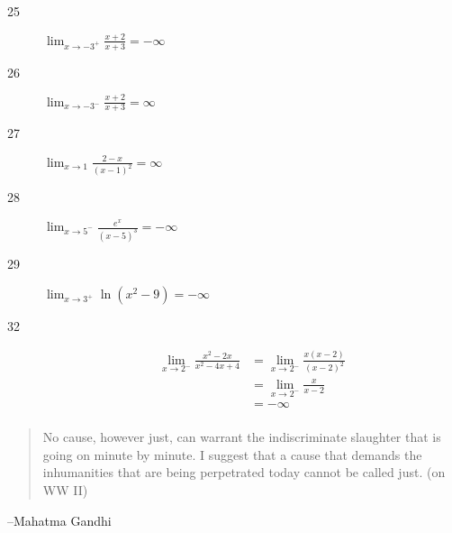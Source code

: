 \documentclass[letterpaper, landscape]{exam}
\begin{document}
\begin{description}




      \item[25] $\lim_{x \to -3^+} \frac{x + 2}{x + 3} = \boxed{ -\infty }$ 

      \item[26] $\lim_{x \to -3^-} \frac{x + 2}{x + 3} = \boxed{ \infty }$ 

      \item[27] $\lim_{x \to 1} \frac{2 - x}{(x - 1)^2} = \boxed{ \infty }$ 

      \item[28] $\lim_{x \to 5^-} \frac{e^x}{(x - 5)^3} = \boxed{ -\infty }$ 

      \item[29] $\lim_{x \to 3^+} \ln \left( x^2 - 9 \right) = \boxed{ -\infty }$ 

      \item[32] 
        \begin{align*}
          \lim_{x \to 2^-} \frac{x^2 - 2x}{x^2 - 4x + 4}   
            & = \lim_{x \to 2^-} \frac{x(x - 2)}{(x - 2)^2} \\
            & = \lim_{x \to 2^-} \frac{x}{x - 2} \\
            & = \boxed{ - \infty } \\
        \end{align*}


    \end{description}

  \else
    \vspace{11 cm}
    \begin{quote}
      \begin{em}
        No cause, however just, can warrant the indiscriminate slaughter that is
        going on minute by minute. I suggest that a cause that demands the
        inhumanities that are being perpetrated today cannot be called just. 
        (on WW II)
      \end{em}
    \end{quote}
    \hspace{1 cm} --Mahatma Gandhi
  \fi
\end{document}
